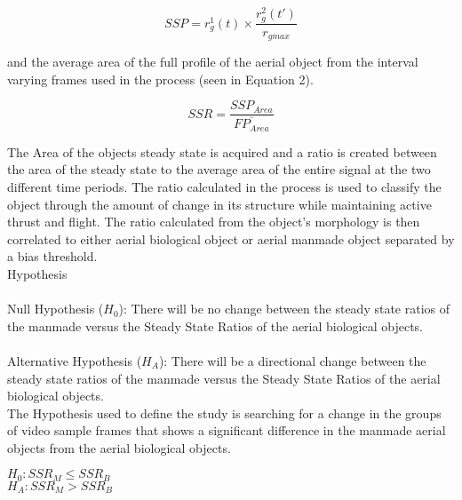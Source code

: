 \begin{equation}
SSP = r_g^1(t) \times \frac{r_g^2(t')}{r_{g max}} 
\end{equation}

and the average area of the full profile of the aerial object from the interval varying frames used in the process (seen in Equation 2). 

\begin{equation}
SSR = \frac{SSP_{Area}}{\overline{FP_{Area}}} 
\end{equation}

\indent The Area of the objects steady state is acquired and a ratio is created between the area of the steady state to the average area of the entire signal at the two different time periods. The ratio calculated in the process is used to classify the object through the amount of change in its structure while maintaining active thrust and flight. The ratio calculated from the object’s morphology is then correlated to either aerial biological object or aerial manmade object separated by a bias threshold.\\
Hypothesis \\ \\
Null Hypothesis ($H_0$): There will be no change between the steady state ratios of the manmade versus the Steady State Ratios of the aerial biological objects. \\ \\
Alternative Hypothesis ($H_A$): There will be a directional change between the steady state ratios of the manmade versus the Steady State Ratios of the aerial biological objects. \\

The Hypothesis used to define the study is searching for a change in the groups of video sample frames that shows a significant difference in the manmade aerial objects from the aerial biological objects. 

\begin{center}
$
H_0: SSR_M \leq SSR_B $\\$
H_A: SSR_M > SSR_B
$
\end{center}

